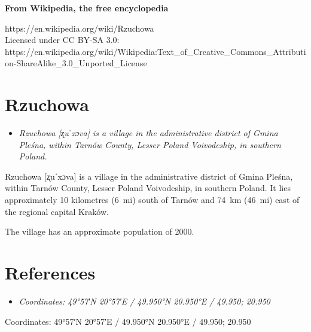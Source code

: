 \textbf{From Wikipedia, the free encyclopedia}

https://en.wikipedia.org/wiki/Rzuchowa\\
Licensed under CC BY-SA 3.0:\\
https://en.wikipedia.org/wiki/Wikipedia:Text\_of\_Creative\_Commons\_Attribution-ShareAlike\_3.0\_Unported\_License

\section{Rzuchowa}\label{rzuchowa}

\begin{itemize}
\item
  \emph{Rzuchowa {[}ʐuˈxɔva{]} is a village in the administrative
  district of Gmina Pleśna, within Tarnów County, Lesser Poland
  Voivodeship, in southern Poland.}
\end{itemize}

Rzuchowa {[}ʐuˈxɔva{]} is a village in the administrative district of
Gmina Pleśna, within Tarnów County, Lesser Poland Voivodeship, in
southern Poland. It lies approximately 10 kilometres (6~mi) south of
Tarnów and 74~km (46~mi) east of the regional capital Kraków.

The village has an approximate population of 2000.

\section{References}\label{references}

\begin{itemize}
\item
  \emph{Coordinates: 49°57′N 20°57′E﻿ / ﻿49.950°N 20.950°E﻿ / 49.950;
  20.950}
\end{itemize}

Coordinates: 49°57′N 20°57′E﻿ / ﻿49.950°N 20.950°E﻿ / 49.950; 20.950
